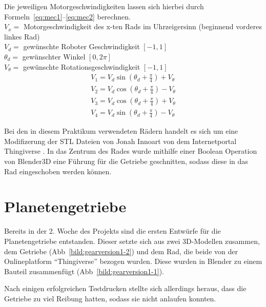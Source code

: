 Die jeweiligen Motorgeschwindigkeiten lassen sich hierbei durch Formeln~\ref{eq:mec1}--\ref{eq:mec2} berechnen.\\

$V_x =$ Motorgeschwindigkeit des x-ten Rads im Uhrzeigersinn (beginnend vorderes linkes Rad)\\
$V_d =$ gewünschte Roboter Geschwindigkeit $[-1, 1]$\\
$\theta_d =$ gewünschter Winkel $[0, 2\pi]$\\
$V_\theta =$ gewünschte Rotationsgeschwindigkeit $[-1, 1]$\\


\begin{align}
	V_1 = V_d\sin{(\theta_d+\frac{\pi}{4})} + V_\theta \label{eq:mec1}\\
	V_2 = V_d\cos{(\theta_d+\frac{\pi}{4})} - V_\theta\\
	V_3 = V_d\cos{(\theta_d+\frac{\pi}{4})} + V_\theta\\
	V_4 = V_d\sin{(\theta_d+\frac{\pi}{4})} - V_\theta \label{eq:mec2}
\end{align} 
\bigskip

Bei den in diesem Praktikum verwendeten Rädern handelt es sich um eine Modifizerung der STL Dateien von Jonah Innoart von dem Internetportal Thingiverse \cite{link:mecanum44}. 
In das Zentrum des Rades wurde mithilfe einer Boolean Operation von Blender3D eine Führung für die Getriebe geschnitten, sodass diese in das Rad eingeschoben werden können.

\section{Planetengetriebe}

Bereits in der 2. Woche des Projekts sind die ersten Entwürfe für die Planetengetriebe entstanden.
Dieser setzte sich aus zwei 3D-Modellen zusammen, dem Getriebe (Abb~\ref{bild:gearversion1-2}) und dem Rad, die beide von der Onlineplatform ``Thingiverse'' bezogen wurden.
Diese wurden in Blender zu einem Bauteil zusammenfügt (Abb~\ref{bild:gearversion1-1}). 

Nach einigen erfolgreichen Testdrucken stellte sich allerdings heraus, dass die Getriebe zu viel Reibung hatten, sodass sie nicht anlaufen konnten.

